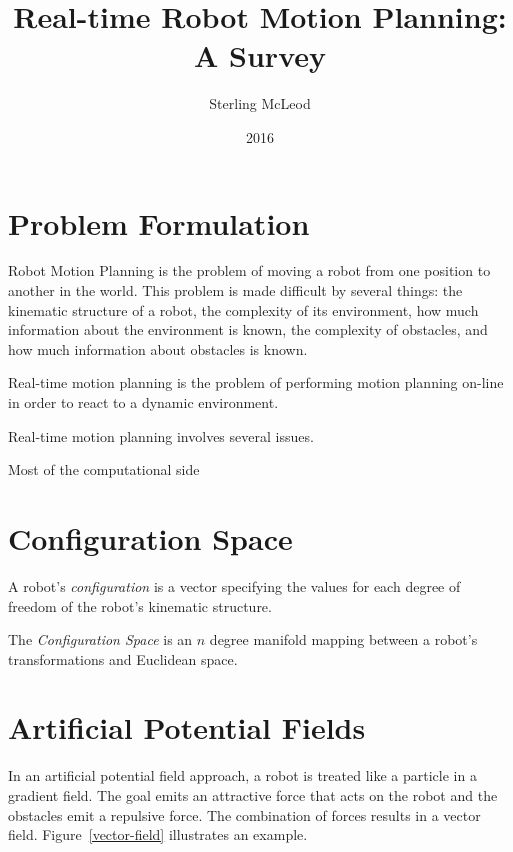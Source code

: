 \documentclass[10pt,conference]{ieeeconf}
\begin{document}
\nocite{PRM}


\author{Sterling McLeod}
\title {Real-time Robot Motion Planning: A Survey}
\date {2016}

\maketitle



\section{Problem Formulation}

	Robot Motion Planning is the problem of moving a robot from one position to another in the world. This problem is made difficult by several things: the kinematic structure of a robot, the complexity of its environment, how much information about the environment is known, the complexity of obstacles, and how much information about obstacles is known. 
	
	Real-time motion planning is the problem of performing motion planning on-line in order to react to a dynamic environment.
	
	Real-time motion planning involves several issues. 
	
	Most of the computational side

	
\section{Configuration Space}

A robot's \emph{configuration} is a vector specifying the values for each degree of freedom of the robot's kinematic structure. 

The \emph{Configuration Space} is an $n$ degree manifold mapping between a robot's transformations and Euclidean space. 




    

\section{Artificial Potential Fields}

In an artificial potential field approach, a robot is treated like a particle in a gradient field. The goal emits an attractive force that acts on the robot and the obstacles emit a repulsive force. The combination of forces results in a vector field. Figure~\ref{vector-field} illustrates an example.
\end{document}
